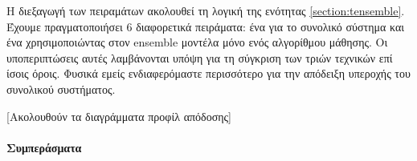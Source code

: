 Η διεξαγωγή των πειραμάτων ακολουθεί τη λογική της ενότητας \ref{section:tensemble}. Έχουμε πραγματοποιήσει 6 διαφορετικά πειράματα: ένα για το συνολικό σύστημα και ένα χρησιμοποιώντας στον ensemble μοντέλα μόνο ενός αλγορίθμου μάθησης. Οι υποπεριπτώσεις αυτές λαμβάνονται υπόψη για τη σύγκριση των τριών τεχνικών επί ίσοις όροις. Φυσικά εμείς ενδιαφερόμαστε περισσότερο για την απόδειξη υπεροχής του συνολικού συστήματος.  

[Ακολουθούν τα διαγράμματα προφίλ απόδοσης]
	
\paragraph{Συμπεράσματα}